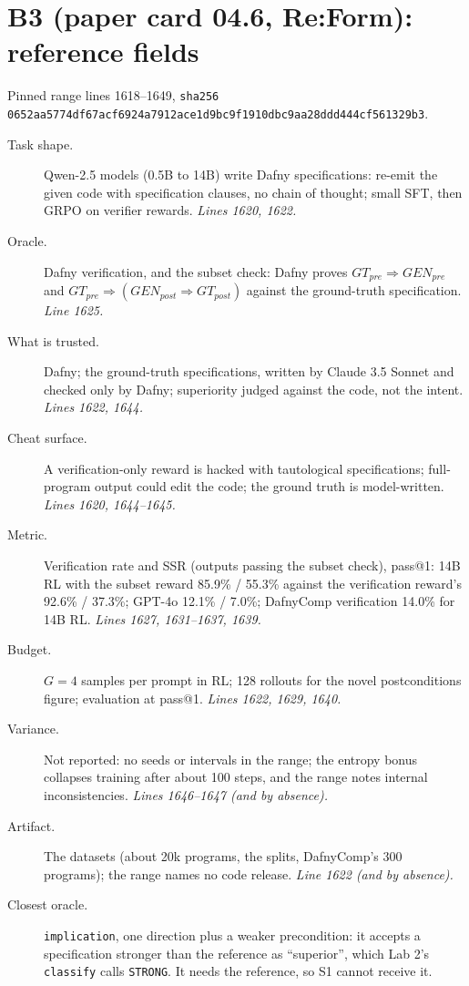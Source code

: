 \documentclass[11pt]{article}
\begin{document}
\section*{B3 (paper card 04.6, Re:Form): reference fields}
Pinned range lines 1618--1649,
\texttt{sha256 0652aa5774df67acf6924a7912ace1d9bc9f1910dbc9aa28ddd444cf561329b3}.
\begin{description}
\item[Task shape.] Qwen-2.5 models (0.5B to 14B) write Dafny specifications:
  re-emit the given code with specification clauses, no chain of thought;
  small SFT, then GRPO on verifier rewards. \emph{Lines 1620, 1622.}
\item[Oracle.] Dafny verification, and the subset check: Dafny proves
  $GT_{pre} \Rightarrow GEN_{pre}$ and $GT_{pre} \Rightarrow (GEN_{post}
  \Rightarrow GT_{post})$ against the ground-truth specification.
  \emph{Line 1625.}
\item[What is trusted.] Dafny; the ground-truth specifications, written by
  Claude 3.5 Sonnet and checked only by Dafny; superiority judged against the
  code, not the intent. \emph{Lines 1622, 1644.}
\item[Cheat surface.] A verification-only reward is hacked with tautological
  specifications; full-program output could edit the code; the ground truth
  is model-written. \emph{Lines 1620, 1644--1645.}
\item[Metric.] Verification rate and SSR (outputs passing the subset check),
  pass@1: 14B RL with the subset reward 85.9\% / 55.3\% against the
  verification reward's 92.6\% / 37.3\%; GPT-4o 12.1\% / 7.0\%; DafnyComp
  verification 14.0\% for 14B RL. \emph{Lines 1627, 1631--1637, 1639.}
\item[Budget.] $G = 4$ samples per prompt in RL; 128 rollouts for the novel
  postconditions figure; evaluation at pass@1. \emph{Lines 1622, 1629, 1640.}
\item[Variance.] Not reported: no seeds or intervals in the range; the entropy
  bonus collapses training after about 100 steps, and the range notes internal
  inconsistencies. \emph{Lines 1646--1647 (and by absence).}
\item[Artifact.] The datasets (about 20k programs, the splits, DafnyComp's
  300 programs); the range names no code release. \emph{Line 1622 (and by
  absence).}
\item[Closest oracle.] \texttt{implication}, one direction plus a weaker
  precondition: it accepts a specification stronger than the reference as
  ``superior'', which Lab 2's \texttt{classify} calls \texttt{STRONG}. It needs
  the reference, so S1 cannot receive it.
\end{description}
\end{document}
